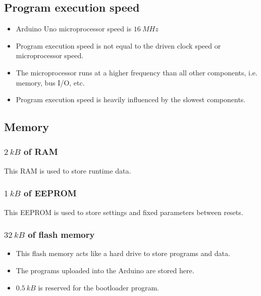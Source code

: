 \documentclass[11pt]{article}
\begin{document}
 \newpage

\subsection{Program execution speed}
\label{sec:org6dc9572}
\begin{itemize}
\item Arduino Uno microprocessor speed is \(\qty{16}{MHz}\)
\item Program execution speed is not equal to the driven clock speed or microprocessor speed.
\item The microprocessor runs at a higher frequency than all other components, i.e. memory, bus I/O, etc.
\item Program execution speed is heavily influenced by the slowest components.
\end{itemize}

\subsection{Memory}
\label{sec:org1f3bd76}

\subsubsection{\(\qty{2}{kB}\) of RAM}
\label{sec:org7b37d54}
This RAM is used to store runtime data.

\subsubsection{\(\qty{1}{kB}\) of EEPROM}
\label{sec:org43edd5f}
This EEPROM is used to store settings and fixed parameters between resets.

\subsubsection{\(\qty{32}{kB}\) of flash memory}
\label{sec:org61af78e}
\begin{itemize}
\item This flash memory acts like a hard drive to store programs and data.
\item The programs uploaded into the Arduino are stored here.
\item \(\qty{0.5}{kB}\) is reserved for the bootloader program.
\end{itemize}
\end{document}
